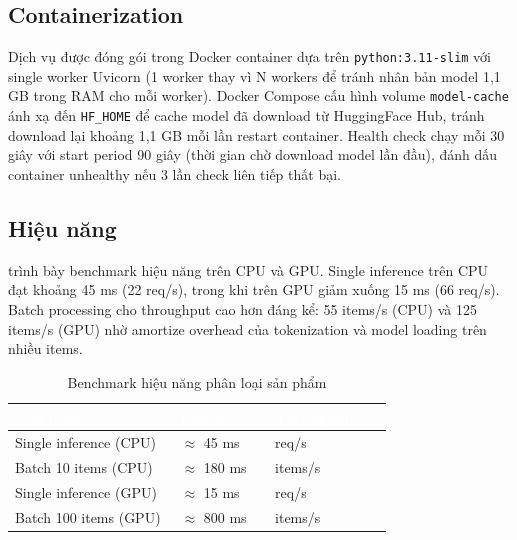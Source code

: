 {\subsection{Containerization}

Dịch vụ được đóng gói trong Docker container dựa trên \texttt{python:3.11-slim}
với single worker Uvicorn (1 worker thay vì N workers để tránh nhân bản
model 1,1 GB trong RAM cho mỗi worker). Docker Compose cấu hình volume
\texttt{model-cache} ánh xạ đến \texttt{HF\_HOME} để cache model đã download
từ HuggingFace Hub, tránh download lại khoảng 1,1 GB mỗi lần restart
container. Health check chạy mỗi 30 giây với start period 90 giây (thời
gian chờ download model lần đầu), đánh dấu container unhealthy nếu 3 lần
check liên tiếp thất bại.

\subsection{Hiệu năng}

 trình bày benchmark hiệu năng trên CPU và GPU.
Single inference trên CPU đạt khoảng 45 ms (22 req/s), trong khi trên GPU
giảm xuống 15 ms (66 req/s). Batch processing cho throughput cao hơn đáng kể:
55 items/s (CPU) và 125 items/s (GPU) nhờ amortize overhead của tokenization
và model loading trên nhiều items.

\begin{table}[htbp]
\centering
\caption{Benchmark hiệu năng phân loại sản phẩm}
\label{tab:classify-benchmark}
\begin{tabular}{>{\raggedright\arraybackslash}p{0.35\linewidth} >{\centering\arraybackslash}p{0.2\linewidth} >{\centering\arraybackslash}p{0.2\linewidth}}
\toprule
\rowcolor{headerblue} \textcolor{white}{\textbf{Cấu hình}} & \textcolor{white}{\textbf{Latency}} & \textcolor{white}{\textbf{Throughput}} \\
\midrule
\rowcolor{rowgray} Single inference (CPU) & $\approx$ 45 ms & 22 req/s \\
Batch 10 items (CPU) & $\approx$ 180 ms & 55 items/s \\
\rowcolor{rowgray} Single inference (GPU) & $\approx$ 15 ms & 66 req/s \\
Batch 100 items (GPU) & $\approx$ 800 ms & 125 items/s \\
\bottomrule
\end{tabular}
\end{table}

}%
